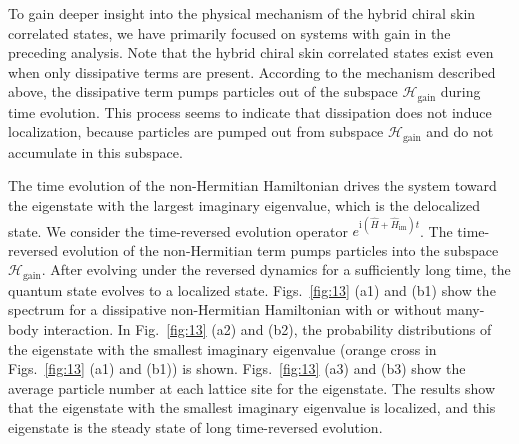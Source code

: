 \documentclass[longbibliography, aps, prx, amsmath, amssymb, amsfonts, twocolumn,superscriptaddress, footinbib]{revtex4-1}
\begin{document}
	
	To gain deeper insight into the physical mechanism of the hybrid chiral skin correlated states, we have primarily focused on systems with gain in the preceding analysis.  
	Note that the hybrid chiral skin correlated states exist even when only dissipative terms are present.
	According to the mechanism described above, the dissipative term pumps particles out of the subspace $\mathscr{H}_{\text{gain}}$ during time evolution.
	This process seems to indicate that dissipation does not induce localization, because particles are pumped out from subspace $\mathscr{H}_{\text{gain}}$ and do not accumulate in this subspace.

	The time evolution of the  non-Hermitian Hamiltonian drives the system toward the eigenstate with the largest imaginary eigenvalue, which is the delocalized state.
	We consider the time-reversed evolution operator $e^{\mathrm{i}(\hat{H} + \hat{H}_{\text{im}})t}$. The time-reversed evolution of the non-Hermitian term pumps particles into the subspace $\mathscr{H}_{\text{gain}}$. After evolving under the reversed dynamics for a sufficiently long time, the quantum state evolves to a localized state.
	Figs.~\ref{fig:13} (a1) and (b1) show the spectrum for a dissipative non-Hermitian Hamiltonian with or without many-body interaction. 
	In Fig.~\ref{fig:13} (a2) and (b2), the probability distributions of the eigenstate with the smallest imaginary eigenvalue (orange cross in Figs.~\ref{fig:13} (a1) and (b1)) is shown.
	Figs.~\ref{fig:13} (a3) and (b3) show the average particle number at each lattice site for the eigenstate. 
	The results show that the eigenstate with the smallest imaginary eigenvalue is localized, and this eigenstate is the steady state of long time-reversed evolution. 
\end{document}
